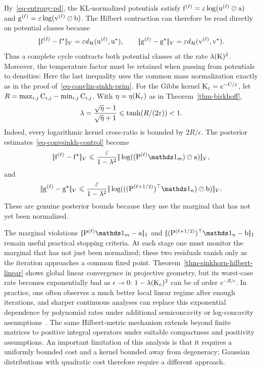 By~\eqref{eq-entropy-pd}, the KL-normalized potentials satisfy
\(
	\mathrm{f}^{(\ell)}=\varepsilon\log(\mathrm{u}^{(\ell)}\oslash\mathrm{a})
\)
and
\(
	\mathrm{g}^{(\ell)}=\varepsilon\log(\mathrm{v}^{(\ell)}\oslash\mathrm{b})
\).
The Hilbert contraction can therefore be read directly on potential classes because
\[
	|\!| \mathrm{f}^{(\ell)}-\mathrm{f}^\star |\!|_V
	=
	\varepsilon d_{\mathcal{H}}(\mathrm{u}^{(\ell)},\mathrm{u}^\star),
	\qquad
	|\!| \mathrm{g}^{(\ell)}-\mathrm{g}^\star |\!|_V
	=
	\varepsilon d_{\mathcal{H}}(\mathrm{v}^{(\ell)},\mathrm{v}^\star).
\]
Thus a complete cycle contracts both potential classes at the rate $\lambda(\mathrm{K})^2$. Moreover, the temperature factor must be retained when passing from potentials to densities:
Here the last inequality uses the common mass normalization exactly as in the proof of~\eqref{eq-convlin-sinkh-prim}. For the Gibbs kernel $\mathrm{K}_\varepsilon=e^{-\mathrm{C}/\varepsilon}$, let $R=\max_{i,j}\mathrm{C}_{i,j}-\min_{i,j}\mathrm{C}_{i,j}$. With $\eta=\eta(\mathrm{K}_\varepsilon)$ as in Theorem~\ref{thm-birkhoff},
\[
	\lambda=\frac{\sqrt{\eta}-1}{\sqrt{\eta}+1}
	\leqslant
	\tanh(R/(2\varepsilon))<1.
\]
Indeed, every logarithmic kernel cross-ratio is bounded by $2R/\epsilon$. The posterior estimates~\eqref{eq-convsinkh-control} become
\[
	\norm{\fD^{(\ell)}-\fD^\star}_V
	\leq
	\frac{\epsilon}{1-\la^2}
	\norm{\log((\P^{(\ell)}\ones_m)\oslash\a)}_V,
\]
and
\[
	\norm{\gD^{(\ell)}-\gD^\star}_V
	\leq
	\frac{\epsilon}{1-\la^2}
	\norm{\log(((\P^{(\ell+1/2)})^\top\ones_n)\oslash\b)}_V.
\]
These are genuine posterior bounds because they use the marginal that has not yet been normalized.



The marginal violations $\norm{\P^{(\ell)}\ones_m-\a}_1$ and $\norm{(\P^{(\ell+1/2)})^\top\ones_n-\b}_1$ remain useful practical stopping criteria. At each stage one must monitor the marginal that has not just been normalized; these two residuals vanish only as the iteration approaches a common fixed point.
Theorem~\ref{thm-sinkhorn-hilbert-linear} shows global linear convergence in projective geometry, but its worst-case rate becomes exponentially bad as $\epsilon\rightarrow0$: $1-\lambda(\mathrm{K}_\varepsilon)^2$ can be of order $e^{-R/\epsilon}$. In practice, one often observes a much better local linear regime after enough iterations, and sharper continuous analyses can replace this exponential dependence by polynomial rates under additional semiconcavity or log-concavity assumptions~\cite{chizat2024sharper}.
%
The same Hilbert-metric mechanism extends beyond finite matrices to positive integral operators under suitable compactness and positivity assumptions.
%
An important limitation of this analysis is that it requires a uniformly bounded cost and a kernel bounded away from degeneracy; Gaussian distributions with quadratic cost therefore require a different approach.

